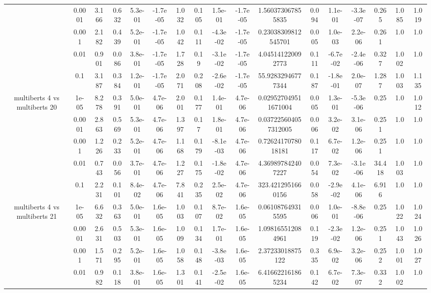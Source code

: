 \begin{tabular}{|c|c|c|c|c|c|c|c|c|c|c|c|c|c|c|c|c|}
 & 0.0001 & 3.166 & 0.632 & 5.3e-01 & -1.7e-05 & 1.032 & 0.105 & 1.5e-01 & -1.7e-05 & 1.560373067855835 & 0.094 & 1.1e-01 & -3.3e-07 & 0.265 & 1.085 & 1.019 \\
 & 0.001 & 2.182 & 0.439 & 5.2e-01 & -1.7e-05 & 1.042 & 0.111 & -4.3e-02 & -1.7e-05 & 0.23038309812545701 & 0.005 & 1.0e-03 & 2.2e-06 & 0.261 & 1.0 & 1.0 \\
 & 0.01 & 0.901 & 0.086 & 3.8e-01 & -1.7e-05 & 1.728 & 0.19 & -3.1e-02 & -1.7e-05 & 4.045141220092773 & 0.111 & -6.7e-02 & -2.4e-06 & 0.327 & 1.002 & 1.0 \\
 & 0.1 & 3.187 & 0.384 & 1.2e-01 & -1.7e-05 & 2.071 & 0.208 & -2.6e-02 & -1.7e-05 & 55.92832946777344 & 0.187 & -1.8e-01 & 2.0e-07 & 1.287 & 1.003 & 1.135 \\
\hline
\multirow{5}{*}{multiberts 4 vs multiberts 20} & 1e-05 & 8.278 & 0.391 & 5.0e-01 & 4.7e-06 & 2.001 & 0.177 & 1.4e-01 & 4.7e-06 & 0.029527049511671004 & 0.005 & 1.3e-01 & -5.3e-06 & 0.25 & 1.0 & 1.012 \\
 & 0.0001 & 2.863 & 0.569 & 5.3e-01 & 4.7e-06 & 1.397 & 0.17 & 1.8e-01 & 4.7e-06 & 0.037225604057312005 & 0.006 & 3.2e-02 & 3.1e-06 & 0.251 & 1.0 & 1.0 \\
 & 0.001 & 1.226 & 0.233 & 5.2e-01 & 4.7e-06 & 1.168 & 0.179 & -8.1e-03 & 4.7e-06 & 0.7262417078018181 & 0.117 & 6.7e-02 & 1.2e-06 & 0.251 & 1.0 & 1.0 \\
 & 0.01 & 0.743 & 0.056 & 3.7e-01 & 4.7e-06 & 1.227 & 0.175 & -1.8e-02 & 4.7e-06 & 4.369897842407227 & 0.054 & 7.3e-02 & -3.1e-06 & 34.418 & 1.003 & 1.0 \\
 & 0.1 & 2.231 & 0.101 & 8.4e-02 & 4.7e-06 & 7.841 & 0.235 & 2.5e-02 & 4.7e-06 & 323.4212951660156 & 0.058 & -2.9e-02 & 4.1e-06 & 6.916 & 1.0 & 1.0 \\
\hline
\multirow{5}{*}{multiberts 4 vs multiberts 21} & 1e-05 & 6.632 & 0.363 & 5.0e-01 & 1.6e-05 & 1.003 & 0.107 & 8.7e-02 & 1.6e-05 & 0.061087649315595 & 0.006 & 1.0e-01 & -8.8e-06 & 0.25 & 1.022 & 1.024 \\
 & 0.0001 & 2.631 & 0.503 & 5.3e-01 & 1.6e-05 & 1.009 & 0.134 & 1.7e-01 & 1.6e-05 & 1.098165512084961 & 0.119 & -2.3e-02 & 1.2e-06 & 0.251 & 1.043 & 1.026 \\
 & 0.001 & 1.571 & 0.295 & 5.2e-01 & 1.6e-05 & 1.058 & 0.148 & -3.8e-03 & 1.6e-05 & 2.37233018875122 & 0.335 & 6.9e-02 & 3.2e-06 & 0.252 & 1.001 & 1.027 \\
 & 0.01 & 0.982 & 0.118 & 3.8e-01 & 1.6e-05 & 1.301 & 0.141 & -2.5e-02 & 1.6e-05 & 6.416622161865234 & 0.142 & 6.7e-02 & 7.3e-07 & 0.332 & 1.002 & 1.0 \\

\end{tabular}
